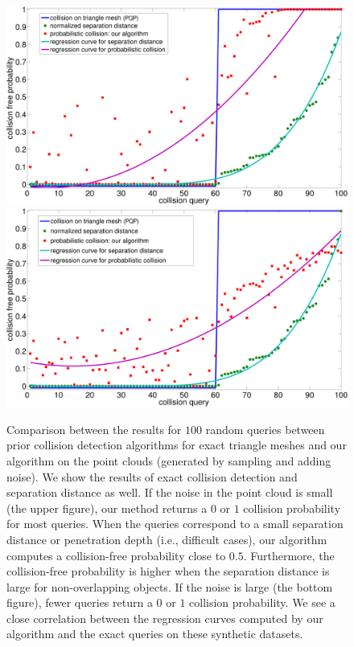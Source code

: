 \begin{figure}[!htb]
  \centering
  \includegraphics[width=0.79\linewidth]{figs/7/smallnoise.pdf}
  \includegraphics[width=0.79\linewidth]{figs/7/largenoise.pdf}
  \caption[Comparison between the results for $100$ random queries between prior collision detection algorithms for exact triangle meshes and our
  algorithm on the point clouds]{\label{fig:7:res1} Comparison between the results for $100$ random queries between prior collision detection algorithms for exact triangle meshes and our
  algorithm on the point clouds (generated by sampling and adding noise). We show the results of exact collision detection and separation distance as well. If the noise in
  the point cloud is small (the upper figure), our method returns a $0$ or $1$ collision probability for most queries. When the queries correspond to a small separation distance or penetration depth (i.e., difficult cases), our algorithm computes a collision-free probability close to $0.5$.
  Furthermore, the collision-free probability is higher when the separation distance is large for non-overlapping objects. If
  the noise is large (the bottom figure), fewer queries return a $0$ or $1$ collision probability. We see a close correlation between the regression
  curves computed by our algorithm and the exact queries on these synthetic datasets.}
\end{figure}

